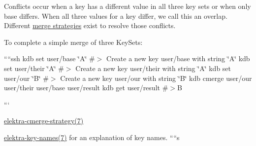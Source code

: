 Conflicts occur when a key has a different value in all three key sets or when only base differs. When all three values for a key differ, we call this an overlap. Different \hyperlink{doc_help_elektra-cmerge-strategy_md}{merge strategies} exist to resolve those conflicts.~\newline


To complete a simple merge of three Key\+Sets\+:~\newline


````ssh kdb set user/base \char`\"{}\+A\char`\"{} \#$>$ Create a new key user/base with string \char`\"{}\+A\char`\"{} kdb set user/their \char`\"{}\+A\char`\"{} \#$>$ Create a new key user/their with string \char`\"{}\+A\char`\"{} kdb set user/our \char`\"{}\+B\char`\"{} \#$>$ Create a new key user/our with string \char`\"{}\+B\char`\"{} kdb cmerge user/our user/their user/base user/result kdb get user/result \#$>$B

```~\newline



\begin{DoxyItemize}
\item \hyperlink{doc_help_elektra-cmerge-strategy_md}{elektra-\/cmerge-\/strategy(7)}
\item \hyperlink{doc_help_elektra-key-names_md}{elektra-\/key-\/names(7)} for an explanation of key names. ````s 
\end{DoxyItemize}